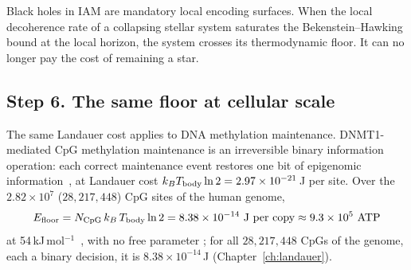 Black holes in IAM are mandatory local encoding surfaces. When the local decoherence rate of a collapsing stellar system saturates the
Bekenstein--Hawking bound at the local horizon, the system crosses its thermodynamic floor. It can no longer pay the cost of remaining a star.
\begin{center}\end{center}

\subsection*{Step 6. The same floor at cellular scale}
The same Landauer cost applies to DNA methylation maintenance. DNMT1-mediated CpG methylation maintenance is an irreversible binary information
operation: each correct maintenance event restores one bit of epigenomic information~\cite{Bestor2000,Jurkowska2011}, at Landauer cost $k_BT_{\rm body}\ln2=2.97\times10^{-21}$\,J per
site. \calc{} Over the $2.82\times10^{7}$ ($28{,}217{,}448$) CpG sites of the human genome,
\begin{equation}
  E_{\rm floor}=N_{\rm CpG}\,k_B\,T_{\rm body}\ln2=8.38\times10^{-14}\ {\rm J\ per\ copy}\approx9.3\times10^{5}\ {\rm ATP}
\end{equation}
at 54\,kJ\,mol$^{-1}$~\cite{Nelson2017}, with no free parameter \calc; for all $28{,}217{,}448$ CpGs of the genome, each a binary decision, it is
$8.38\times10^{-14}$\,J (Chapter~\ref{ch:landauer}).

